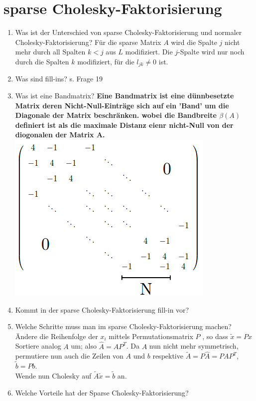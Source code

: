 \documentclass[10pt,a4paper,titlepage]{article}
\newcommand{\chf}{Cholesky-Faktorisierung\xspace}
\begin{document}
\section{sparse \chf}
\begin{enumerate}[resume=b]
	\item Was ist der Unterschied von sparse \chf und normaler \chf?\newline
	Für die sparse Matrix $A$ wird die Spalte $j$ nicht mehr durch all Spalten $k<j$ aus $L$ modifiziert. Die $j$-Spalte wird nur noch durch die Spalten $k$ modifiziert, für die $l_{jk}\neq0$ ist.
	\item Was sind fill-ins? \newline
	s. Frage 19
	\item Was ist eine Bandmatrix? \newline
	\textbf{Eine Bandmatrix ist eine dünnbesetzte Matrix deren Nicht-Null-Einträge sich auf ein 'Band' um die Diagonale der Matrix beschränken. wobei die Bandbreite $\beta(A)$ definiert ist als die maximale Distanz eienr nicht-Null von der diogonalen der Matrix A.}
	\includegraphics{bandmatrix.png}
	\item Kommt in der sparse \chf fill-in vor?
	\item Welche Schritte muss man im sparse \chf machen?\newline
	Ändere die Reihenfolge der $x_i$ mittels Permutationsmatrix $P$ , so dass $\tilde{x}=Px$\\
	Sortiere analog $A$ um; also $\hat{A}=AP^T$. Da $A$ nun nicht mehr symmetrisch, permutiere nun auch die Zeilen von $A$ und $b$ respektive $\tilde{A}=P\hat{A}=PAP^T$, $\tilde{b}=Pb$.\\ 
	Wende nun Cholesky auf $\tilde{A}\tilde{x}=\tilde{b}$ an.
	\item Welche Vorteile hat der Sparse \chf? \newline

\end{enumerate}
\end{document}
